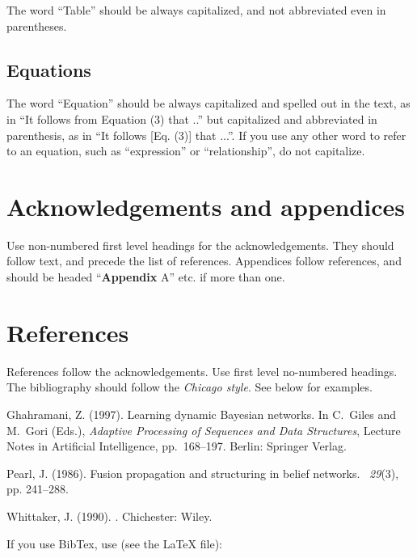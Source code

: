 \documentclass [10pt]{article}
\begin{document}
The word ``Table'' should be always capitalized, and not abbreviated even in parentheses.

\subsection{Equations}
The word ``Equation'' should be always capitalized and spelled out in the text, as in ``It follows from Equation (3) that ..'' but capitalized and abbreviated in parenthesis, as in ``It follows [Eq. (3)] that ...''. If you use any other word to refer to an equation, such as ``expression'' or ``relationship'', do not capitalize.

\section*{Acknowledgements and appendices}
Use non-numbered first level headings for the acknowledgements. They should follow text, and precede the list of references. Appendices follow references, and should be headed ``{\bf Appendix} A'' etc. if more than one.

\section*{References}
References follow the acknowledgements. Use first level no-numbered headings. The bibliography should follow the {\it Chicago style}. See below for examples.

\hangindent=0.5cm  %
Ghahramani, Z. (1997).
\newblock Learning dynamic Bayesian networks.
\newblock In C.~Giles and M.~Gori (Eds.), {\em Adaptive Processing of Sequences and Data Structures}, Lecture Notes in Artificial Intelligence, pp.\ 168--197. Berlin: Springer Verlag.

\hangindent=0.5cm  %
Pearl, J. (1986).
\newblock Fusion propagation and structuring in belief networks.
~{\em 29\/}(3), pp. 241--288.

\hangindent=0.5cm  %
Whittaker, J. (1990).
.
\newblock Chichester: Wiley.

If you use BibTex, use (see the LaTeX file):



\end{document}
